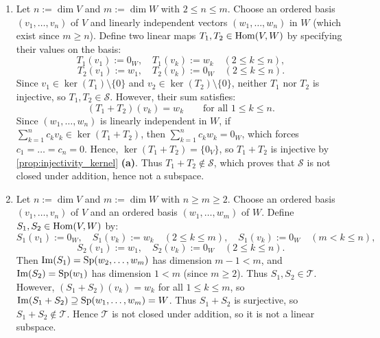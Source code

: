 

\begin{exercisesolution}
\label{sol:hom_non_injective_non_surjective_not_subspaces}
\begin{enumerate}[label=\textbf{(\alph*)}]
    \item Let $n := \dim V$ and $m := \dim W$ with $2 \le n \le m$.
    Choose an ordered basis $(v_1, \dots, v_n)$ of $V$ and linearly independent vectors $(w_1, \dots, w_n)$ in $W$ (which exist since $m \ge n$).
    Define two linear maps $T_1, T_2 \in \operatorname{Hom}(V, W)$ by specifying their values on the basis:
    \[
    T_1(v_1) := 0_W, \quad T_1(v_k) := w_k \quad (2 \le k \le n),
    \]
    \[
    T_2(v_1) := w_1, \quad T_2(v_k) := 0_W \quad (2 \le k \le n).
    \]
    Since $v_1 \in \ker(T_1) \setminus \{0\}$ and $v_2 \in \ker(T_2) \setminus \{0\}$, neither $T_1$ nor $T_2$ is injective, so $T_1, T_2 \in \mathcal{S}$.
    However, their sum satisfies:
    \[
    (T_1 + T_2)(v_k) = w_k \qquad \text{for all } 1 \le k \le n.
    \]
    Since $(w_1, \dots, w_n)$ is linearly independent in $W$, if $\sum_{k=1}^n c_k v_k \in \ker(T_1 + T_2)$, then $\sum_{k=1}^n c_k w_k = 0_W$, which forces $c_1 = \dots = c_n = 0$. Hence, $\ker(T_1 + T_2) = \{0_V\}$, so $T_1 + T_2$ is injective by \cref{prop:injectivity_kernel} \textbf{(a)}.
    Thus $T_1 + T_2 \notin \mathcal{S}$, which proves that $\mathcal{S}$ is not closed under addition, hence not a subspace.

    \item Let $n := \dim V$ and $m := \dim W$ with $n \ge m \ge 2$.
    Choose an ordered basis $(v_1, \dots, v_n)$ of $V$ and an ordered basis $(w_1, \dots, w_m)$ of $W$.
    Define $S_1, S_2 \in \operatorname{Hom}(V, W)$ by:
    \[
    S_1(v_1) := 0_W, \quad S_1(v_k) := w_k \quad (2 \le k \le m), \quad S_1(v_k) := 0_W \quad (m < k \le n),
    \]
    \[
    S_2(v_1) := w_1, \quad S_2(v_k) := 0_W \quad (2 \le k \le n).
    \]
    Then $\operatorname{Im}(S_1) = \operatorname{Sp}(w_2, \dots, w_m)$ has dimension $m-1 < m$, and $\operatorname{Im}(S_2) = \operatorname{Sp}(w_1)$ has dimension $1 < m$ (since $m \ge 2$).
    Thus $S_1, S_2 \in \mathcal{T}$.
    However, $(S_1 + S_2)(v_k) = w_k$ for all $1 \le k \le m$, so $\operatorname{Im}(S_1 + S_2) \supseteq \operatorname{Sp}(w_1, \dots, w_m) = W$.
    Thus $S_1 + S_2$ is surjective, so $S_1 + S_2 \notin \mathcal{T}$.
    Hence $\mathcal{T}$ is not closed under addition, so it is not a linear subspace. \qedhere
\end{enumerate}
\end{exercisesolution}

